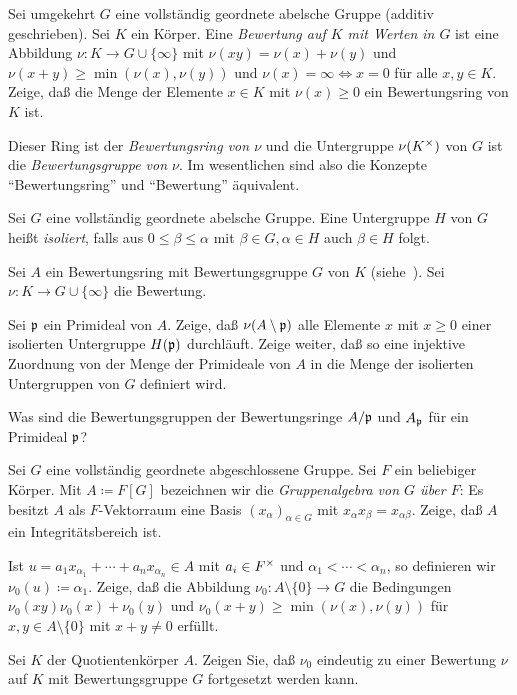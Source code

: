 \begin{exercise}
	\label{exer:valuation}
	Sei umgekehrt \(G\) eine vollständig geordnete abelsche Gruppe (additiv
	geschrieben).
	Sei \(K\) ein Körper. Eine \emph{Bewertung auf \(K\) mit Werten in \(G\)}
	ist eine Abbildung \(\nu\colon K \to G \cup \{\infty\}\) mit
	\(\nu(xy) = \nu(x) + \nu(y)\) und \(\nu(x + y) \ge \min(\nu(x), \nu(y))\)
	und \(\nu(x) = \infty \iff x = 0\)
	für alle \(x, y \in K\). Zeige, daß die Menge der Elemente \(x \in K\) mit
	\(\nu(x) \ge 0\) ein Bewertungsring von \(K\) ist.
	
	Dieser Ring ist der \emph{Bewertungsring von \(\nu\)} und die Untergruppe
	\(\nu(K^\times)\) von \(G\) ist die \emph{Bewertungsgruppe von \(\nu\)}.
	Im wesentlichen sind also die Konzepte "`Bewertungsring"' und
	"`Bewertung"' äquivalent.
\end{exercise}

\begin{exercise}
	Sei \(G\) eine vollständig geordnete abelsche Gruppe. Eine Untergruppe
	\(H\) von \(G\) heißt \emph{isoliert}, falls aus \(0 \le \beta \le \alpha\)
	mit \(\beta \in G, \alpha \in H\) auch \(\beta \in H\) folgt.
	
	Sei \(A\) ein Bewertungsring mit Bewertungsgruppe \(G\) von \(K\)
	(siehe~). Sei \(\nu\colon K \to G \cup
	\{\infty\}\) die Bewertung.
	
	Sei \(\mathfrak{p}\) ein Primideal von \(A\).
	Zeige, daß \(\nu(A \setminus \mathfrak{p})\) alle Elemente \(x\) mit \(x \ge 0\)
	einer isolierten Untergruppe \(H(\mathfrak{p})\) durchläuft. Zeige weiter, daß
	so eine injektive Zuordnung von der Menge der Primideale von \(A\) in die
	Menge der isolierten Untergruppen von \(G\) definiert wird.
	
	Was sind die Bewertungsgruppen der Bewertungsringe \(A/\mathfrak{p}\) und
	\(A_{\mathfrak{p}}\) für ein Primideal \(\mathfrak{p}\)?
\end{exercise}

\begin{exercise}
	Sei \(G\) eine vollständig geordnete abgeschlossene Gruppe. Sei \(F\) ein
	beliebiger Körper. Mit \(A \coloneqq F[G]\) bezeichnen wir die
	\emph{Gruppenalgebra von \(G\) über \(F\)}: Es besitzt \(A\) als
	\(F\)-Vektorraum eine Basis \((x_\alpha)_{\alpha \in G}\) mit
	\(x_\alpha x_\beta =
	x_{\alpha \beta}\). Zeige, daß \(A\) ein Integritätsbereich ist.
	
	Ist \(u = a_1 x_{\alpha_1} + \dotsb + a_n x_{\alpha_n} \in A\) mit
	\(a_i \in F^\times\) und \(\alpha_1 < \dotsb < \alpha_n\), so definieren wir
	\(\nu_0(u) \coloneqq \alpha_1\). Zeige, daß die Abbildung
	\(\nu_0\colon A \setminus \{0\} \to G\) die Bedingungen
	\(\nu_0(xy) \nu_0(x) + \nu_0(y)\) und \(\nu_0(x + y) \ge \min(\nu(x), \nu(y))\)
	für \(x, y \in A \setminus \{0\}\) mit \(x + y \neq 0\) erfüllt.
	
	Sei \(K\) der Quotientenkörper \(A\). Zeigen Sie, daß \(\nu_0\) eindeutig zu
	einer Bewertung \(\nu\) auf \(K\) mit Bewertungsgruppe \(G\) fortgesetzt
	werden kann.
\end{exercise}

